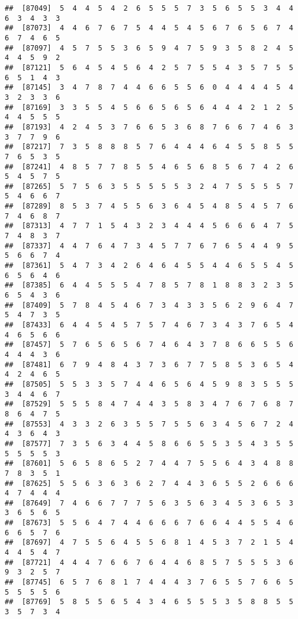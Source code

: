\documentclass[
]{book}
\begin{document}
\begin{verbatim}
##  [87049]  5  4  4  5  4  2  6  5  5  5  7  3  5  6  5  5  3  4  4  6  3  4  3  3
##  [87073]  4  4  6  7  6  7  5  4  4  5  4  5  6  7  6  5  6  7  4  6  7  4  6  5
##  [87097]  4  5  7  5  5  3  6  5  9  4  7  5  9  3  5  8  2  4  5  4  4  5  9  2
##  [87121]  5  6  4  5  4  5  6  4  2  5  7  5  5  4  3  5  7  5  5  6  5  1  4  3
##  [87145]  3  4  7  8  7  4  4  6  6  5  5  6  0  4  4  4  4  5  4  3  2  3  3  6
##  [87169]  3  3  5  5  4  5  6  6  5  6  5  6  4  4  4  2  1  2  5  4  4  5  5  5
##  [87193]  4  2  4  5  3  7  6  6  5  3  6  8  7  6  6  7  4  6  3  3  7  7  9  6
##  [87217]  7  3  5  8  8  8  5  7  6  4  4  4  6  4  5  5  8  5  5  7  6  5  3  5
##  [87241]  4  8  5  7  7  8  5  5  4  6  5  6  8  5  6  7  4  2  6  5  4  5  7  5
##  [87265]  5  7  5  6  3  5  5  5  5  5  3  2  4  7  5  5  5  5  7  5  4  6  6  7
##  [87289]  8  5  3  7  4  5  5  6  3  6  4  5  4  8  5  4  5  7  6  7  4  6  8  7
##  [87313]  4  7  7  1  5  4  3  2  3  4  4  4  5  6  6  6  4  7  5  7  4  8  3  7
##  [87337]  4  4  7  6  4  7  3  4  5  7  7  6  7  6  5  4  4  9  5  5  6  6  7  4
##  [87361]  5  4  7  3  4  2  6  4  6  4  5  5  4  4  6  5  5  4  5  6  5  6  4  6
##  [87385]  6  4  4  5  5  5  4  7  8  5  7  8  1  8  8  3  2  3  5  6  5  4  3  6
##  [87409]  5  7  8  4  5  4  6  7  3  4  3  3  5  6  2  9  6  4  7  5  4  7  3  5
##  [87433]  6  4  4  5  4  5  7  5  7  4  6  7  3  4  3  7  6  5  4  4  6  5  6  6
##  [87457]  5  7  6  5  6  5  6  7  4  6  4  3  7  8  6  6  5  5  6  4  4  4  3  6
##  [87481]  6  7  9  4  8  4  3  7  3  6  7  7  5  8  5  3  6  5  4  4  2  4  6  5
##  [87505]  5  5  3  3  5  7  4  4  6  5  6  4  5  9  8  3  5  5  5  3  4  4  6  7
##  [87529]  5  5  5  8  4  7  4  4  3  5  8  3  4  7  6  7  6  8  7  8  6  4  7  5
##  [87553]  4  3  3  2  6  3  5  5  7  5  5  6  3  4  5  6  7  2  4  4  3  6  4  3
##  [87577]  7  3  5  6  3  4  4  5  8  6  6  5  5  3  5  4  3  5  5  5  5  5  5  3
##  [87601]  5  6  5  8  6  5  2  7  4  4  7  5  5  6  4  3  4  8  8  7  8  3  5  1
##  [87625]  5  5  6  3  6  3  6  2  7  4  4  3  6  5  5  2  6  6  6  4  7  4  4  4
##  [87649]  7  4  6  6  7  7  7  5  6  3  5  6  3  4  5  3  6  5  3  3  6  5  6  5
##  [87673]  5  5  6  4  7  4  4  6  6  6  7  6  6  4  4  5  5  4  6  6  6  5  7  6
##  [87697]  4  7  5  5  6  4  5  5  6  8  1  4  5  3  7  2  1  5  4  4  4  5  4  7
##  [87721]  4  4  4  7  6  6  7  6  4  4  6  8  5  7  5  5  5  3  6  9  3  2  5  7
##  [87745]  6  5  7  6  8  1  7  4  4  4  3  7  6  5  5  7  6  6  5  5  5  5  5  6
##  [87769]  5  8  5  5  6  5  4  3  4  6  5  5  5  3  5  8  8  5  5  3  5  7  3  4

\end{verbatim}
\end{document}
